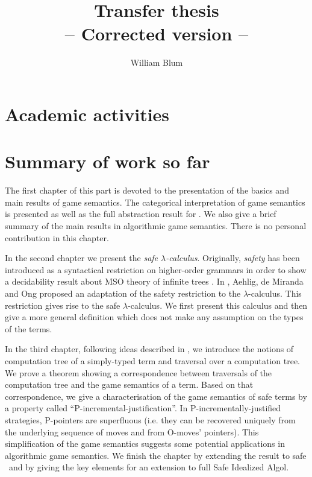 \ifx\incrcompilation\undefined  \fi
%
%
%


\author{William Blum}
\title{Transfer thesis \\ {\small --  Corrected version --}}


\maketitle \tableofcontents

\chapapp{}
\part{Academic activities} %


\setcounter{chapter}{0}
\part{Summary of work so far}

The first chapter of this part is devoted to the presentation of the
basics and main results of game semantics. The categorical
interpretation of game semantics is presented as well as the full
abstraction result for \pcf. We also give a brief summary of the
main results in algorithmic game semantics. There is no personal
contribution in this chapter.

In the second chapter we present the \emph{safe $\lambda$-calculus}.
Originally, \emph{safety} has been introduced as a syntactical
restriction on higher-order grammars in order to show a decidability
result about MSO theory of infinite trees \citep{KNU02}. In
\cite{safety-mirlong2004}, Aehlig, de Miranda and Ong  proposed an
adaptation of the safety restriction to the $\lambda$-calculus. This
restriction gives rise to the safe $\lambda$-calculus. We first
present this calculus and then give a more general definition which
does not make any assumption on the types of the terms.

In the third chapter, following ideas described in
\cite{OngLics2006}, we introduce the notions of computation tree of
a simply-typed term and traversal over a computation tree. We prove
a theorem showing a correspondence between traversals of the
computation tree and the game semantics of a term. Based on that
correspondence, we give a characterisation of the game semantics of
safe terms by a property called ``P-incremental-justification''. In
P-incrementally-justified strategies, P-pointers are superfluous (i.e.
they can be recovered uniquely from the underlying sequence of
moves and from O-moves' pointers). This simplification of the game semantics suggests some potential applications in algorithmic game semantics. We finish the
chapter by extending the result to safe \pcf\ and by giving the key
elements for an extension to full Safe Idealized Algol.


